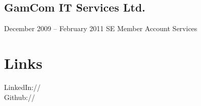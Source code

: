 \documentclass[]{deedy-resume-openfont}
\begin{document}
\begin{minipage}[t]{0.33\textwidth}
\subsection{GamCom IT Services Ltd.}
December 2009 – February 2011 \textbullet{} SE \textbullet{} Member Account Services
\sectionsep



\section{Links} 
LinkedIn://  \href{https://www.linkedin.com/in/rohan-pithadiya}{} \\
Github:// \href{https://github.com/Rohanpithadiya}{} \\
\sectionsep

%
%

\end{minipage} 
\hfill
\end{document}
